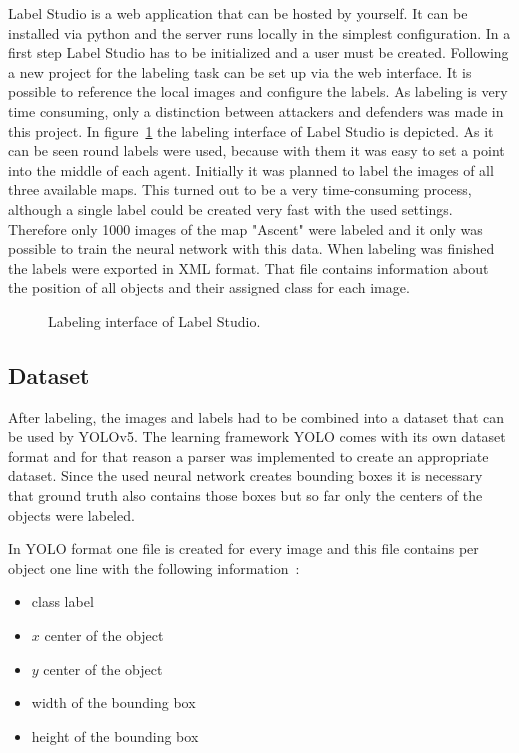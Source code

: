 Label Studio is a web application that can be hosted by yourself. It can be installed via python and 
the server runs locally in the simplest configuration. In a first step Label Studio has to be initialized 
and a user must be created. Following a new project for the labeling task can be set up via the web 
interface. It is possible to reference the local images and configure the labels. As labeling is very 
time consuming, only a distinction between attackers and defenders was made in this project. In 
figure~\ref{fig:app:labelstudio} the labeling interface of Label Studio is depicted. As it can be seen  
round labels were used, because with them it was easy to set a point into the middle of each 
agent. Initially it was planned to label the images of all three available maps. This turned out to be a 
very time-consuming process, although a single label could be created very fast with the used 
settings. Therefore only 1000 images of the map "Ascent" were labeled and it only was possible to 
train the neural network with this data. When labeling was finished the labels were exported in XML 
format. That file contains information about the position of all objects and their assigned class for 
each image.

\begin{figure}
	\centering
	\caption[Interface of Label Studio.]{Labeling interface of Label Studio.}
	\label{fig:app:labelstudio}
\end{figure}

\subsection{Dataset}\label{subsec:app:dataset}

After labeling, the images and labels had to be combined into a dataset that can be used by 
YOLOv5. The learning framework YOLO comes with its own dataset format and for that reason a 
parser was implemented to create an appropriate dataset. Since the used neural network creates 
bounding boxes it is necessary that ground truth also contains those boxes but so far only the 
centers of the objects were labeled. 

In YOLO format one file is created for every image and this file contains per object one line with the 
following information~\cite{yoloLabels}:

\begin{itemize}
	\item class label
	\item $x$ center of the object
	\item $y$ center of the object
	\item width of the bounding box
	\item height of the bounding box
\end{itemize}

